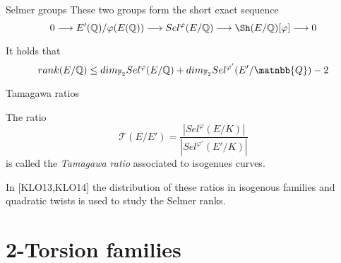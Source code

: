 \documentclass[presentation]{beamer}
\begin{document}
\begin{frame}[label={sec:org6a5e27d}]{Selmer groups}
These two groups form the short exact sequence
$$0 \longrightarrow E'(\mathbb{Q})/\varphi(E(\mathbb{Q}))
\longrightarrow Sel^\varphi(E/\mathbb{Q}) \longrightarrow
\Sh(E/\mathbb{Q})[\varphi] \longrightarrow 0$$

It holds that
$$rank(E/\mathbb{Q}) \le dim_{\mathbb{F}_2}Sel^\varphi(E/\mathbb{Q}) +
dim_{\mathbb{F}_2}Sel^{\varphi'}(E'/\matnbb{Q}) - 2$$
\end{frame}
\begin{frame}[label={sec:org3528283}]{Tamagawa ratios}
\begin{definition}
The ratio
$$\mathscr{T}(E/E') = \frac{|Sel^\varphi(E/K)|}{|Sel^{\varphi'}(E'/K)|}$$
is called the \emph{Tamagawa ratio} associated to isogenues curves.
\end{definition}

In [KLO13,KLO14] the distribution of these ratios in isogenous families
and quadratic twists is used to study the Selmer ranks.
\end{frame}
\section{2-Torsion families}
\label{sec:orgdc821d8}
\end{document}

